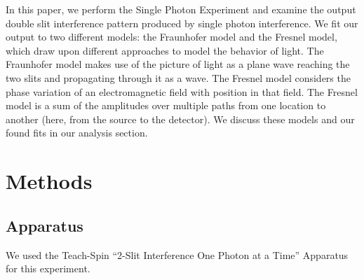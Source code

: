 \documentclass[prb,preprint]{revtex4-1}
\begin{document}
In this paper, we perform the Single Photon Experiment and examine the output double slit interference pattern produced by single photon interference.  We fit our output to two different models:  the Fraunhofer model and the Fresnel model, which draw upon different approaches to model the behavior of light.  The Fraunhofer model makes use of the picture of light as a plane wave reaching the two slits and propagating through it as a wave.  The Fresnel model considers the phase variation of an electromagnetic field with position in that field.  The Fresnel model is a sum of the amplitudes over multiple paths from one location to another (here, from the source to the detector).  We discuss these models and our found fits in our analysis section.


\section{Methods}

\subsection{Apparatus}

We used the Teach-Spin ``2-Slit Interference One Photon at a Time'' Apparatus for this experiment. 
\end{document}
